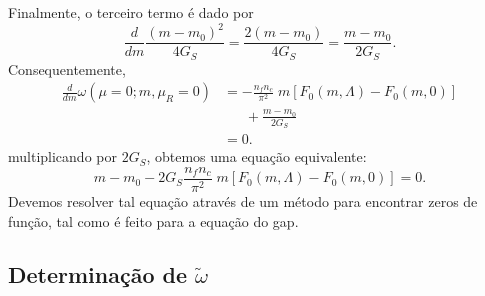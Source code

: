 Finalmente, o terceiro termo é dado por
\begin{equation}
	\frac{d}{dm} \frac{(m - m_0)^2}{4G_S} = \frac{2 (m - m_0)}{4G_S} = \frac{m - m_0}{2G_S}.
\end{equation}
%
Consequentemente,
\begin{align}
	\frac{d}{dm} \omega(\mu = 0; m, \mu_R = 0) &= - \frac{n_f n_c}{\pi^2} \;m [F_0(m, \Lambda) - F_0(m,0)] \\
	&\phantom{=}~+ \frac{m - m_0}{2G_S} \nonumber \\
	&= 0.
\end{align}
%
multiplicando por $2G_S$, obtemos uma equação equivalente:
\begin{equation}\label{Eq:Calculo_m_vac}
	m - m_0 - 2G_S\frac{n_f n_c}{\pi^2} \;m [F_0(m, \Lambda) - F_0(m,0)] = 0.
\end{equation}
%
Devemos resolver tal equação através de um método para encontrar zeros de função, tal como é feito para a equação do gap.

\subsection{Determinação de $\tilde{\omega}$}

